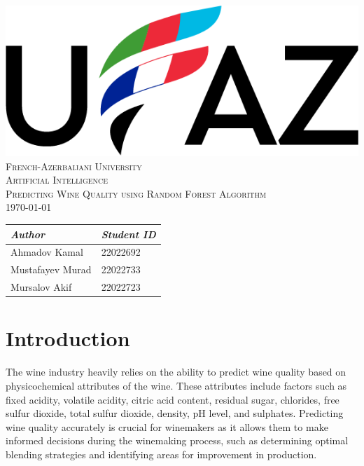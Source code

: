 \documentclass{ufazreport}
\def\course{Artificial Intelligence}      %
\def\thetitle{Predicting Wine Quality using Random Forest Algorithm}               %
\def\date{\today}                         %
\begin{document}
\begin{center}
    \vspace*{1.5cm}
    \includegraphics[scale = 0.5]{images/UFAZ.png}\\[1.75cm]
    \textsc{\color[RGB]{0, 51, 102}\LARGE{French-Azerbaijani University}}\\[1cm]
    \textsc{\Large{\course}}\\[.5cm]
    \textsc{\Large{\thetitle}}\\[.5cm]
    \textsc{\date}\\[2cm]
    \Large{
    \begin{tabular}{L{5cm} R{5cm}}
        \textit{Author} &  \textit{Student ID}\\
        \hline
        Ahmadov Kamal & 22022692\\
        Mustafayev Murad & 22022733\\
        Mursalov Akif & 22022723
        
    \end{tabular}
    }
\end{center}
\thispagestyle{empty}
\pagebreak

\tableofcontents{}
\pagebreak

\section{Introduction}

The wine industry heavily relies on the ability to predict wine quality based on physicochemical attributes of the wine. These attributes include factors such as fixed acidity, volatile acidity, citric acid content, residual sugar, chlorides, free sulfur dioxide, total sulfur dioxide, density, pH level, and sulphates. Predicting wine quality accurately is crucial for winemakers as it allows them to make informed decisions during the winemaking process, such as determining optimal blending strategies and identifying areas for improvement in production.
\end{document}
